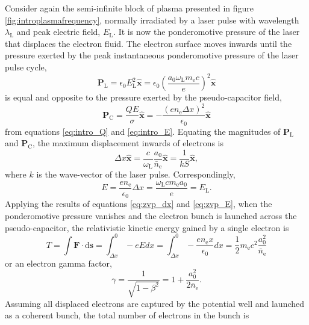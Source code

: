 Consider again the semi-infinite block of plasma presented in figure \ref{fig:introplasmafrequency}, normally irradiated by a laser pulse with wavelength $\lambda_\mathrm{L}$ and peak electric field, $E_\mathrm{L}$. It is now the ponderomotive pressure of the laser that displaces the electron fluid. The electron surface moves inwards until the pressure exerted by the peak instantaneous ponderomotive pressure of the laser pulse cycle,
\begin{equation}
	\mathbf{P}_\mathrm{L} = \epsilon_0 E^2_\mathrm{L} \hat{\mathbf{x}} = \epsilon_0 \left(\frac{a_0\omega_\mathrm{L}m_\mathrm{e}c}{e}\right)^2 \hat{\mathbf{x}}
\end{equation}
is equal and opposite to the pressure exerted by the pseudo-capacitor field,
\begin{equation}
	\mathbf{P}_\mathrm{C} = \frac{QE}{\sigma} \hat{\mathbf{x}}= -\frac{(en_\mathrm{e}\Delta x)^2}{\epsilon_0}\hat{\mathbf{x}}
\end{equation} 
from equations \ref{eq:intro_Q} and \ref{eq:intro_E}. Equating the magnitudes of $\mathbf{P}_\mathrm{L}$ and $\mathbf{P}_\mathrm{C}$, the maximum displacement inwards of electrons is
\begin{equation}\label{eq:zvp_dx}
	\Delta x \hat{\mathbf{x}} = \frac{c}{\omega_\mathrm{L}}\frac{a_0}{\bar{n}_\mathrm{e}}\hat{\mathbf{x}}  = \frac{1}{kS}\hat{\mathbf{x}},
\end{equation}
where $k$ is the wave-vector of the laser pulse. Correspondingly,
\begin{equation}\label{eq:zvp_E}
	E = \frac{en_\mathrm{e}}{\epsilon_0}\Delta x = \frac{\omega_\mathrm{L}cm_\mathrm{e}a_0}{e} = E_\mathrm{L}.
\end{equation}
Applying the results of equations \ref{eq:zvp_dx} and \ref{eq:zvp_E}, when the ponderomotive pressure vanishes and the electron bunch is launched across the pseudo-capacitor, the relativistic kinetic energy gained by a single electron is
\begin{equation}\label{eq:zvp_T}
	T =  \int \mathbf{F}\cdot\mathrm{d}\mathbf{s} = \int^0_{\Delta x} -eEdx = \int^0_{\Delta x}-\frac{en_\mathrm{e}x}{\epsilon_0}dx = \frac{1}{2}m_\mathrm{e}c^2\frac{a^2_0}{\bar{n}_\mathrm{e}}
\end{equation}
or an electron gamma factor,
\begin{equation}
	\gamma = \frac{1}{\sqrt{1-\beta^2}} = 1 + \frac{a_0^2}{2\bar{n}_\mathrm{e}}.
\end{equation}
Assuming all displaced electrons are captured by the potential well and launched as a coherent bunch, the total number of electrons in the bunch is
